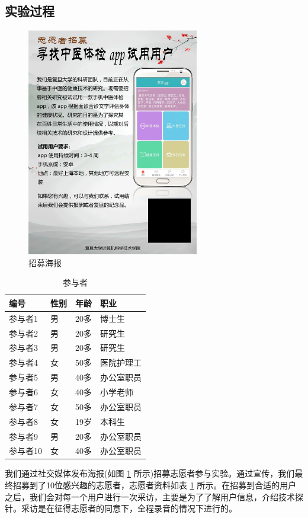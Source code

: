 \subsection{实验过程}
\begin{figure}[h]
    \centering
    \includegraphics[height=10cm]{images/poster.png}
    \caption{招募海报}
    \label{fig:poster}
\end{figure}


\begin{table}
    \centering
    \begin{tabular}{llll}
          \toprule
          编号 &	性别 &	年龄 &	职业 \\
          \midrule
          参与者1 &	男 &	20多 &	博士生 \\
          参与者2 &	男 &	20多 &	研究生 \\
          参与者3 &	男 &	20多 &	研究生 \\
          参与者4 &	女 &	50多 &	医院护理工 \\
          参与者5 &	男 &	40多 &	办公室职员 \\
          参与者6 &	女 &	40多 &	小学老师 \\
          参与者7 &	女 &	50多 &	办公室职员 \\
          参与者8 &	女 &	19岁 &	本科生 \\
          参与者9 &	男 &	20多 &	办公室职员 \\
          参与者10 &	女 &	40多 &	办公室职员 \\
          \bottomrule
    \end{tabular}
    \caption{参与者}
    \label{tab:part}
  \end{table}
我们通过社交媒体发布海报(如图 \ref{fig:poster} 所示)招募志愿者参与实验。通过宣传，我们最终招募到了10位感兴趣的志愿者，志愿者资料如表 \ref{tab:part} 所示。在招募到合适的用户之后，我们会对每一个用户进行一次采访，主要是为了了解用户信息，介绍技术探针。采访是在征得志愿者的同意下，全程录音的情况下进行的。

